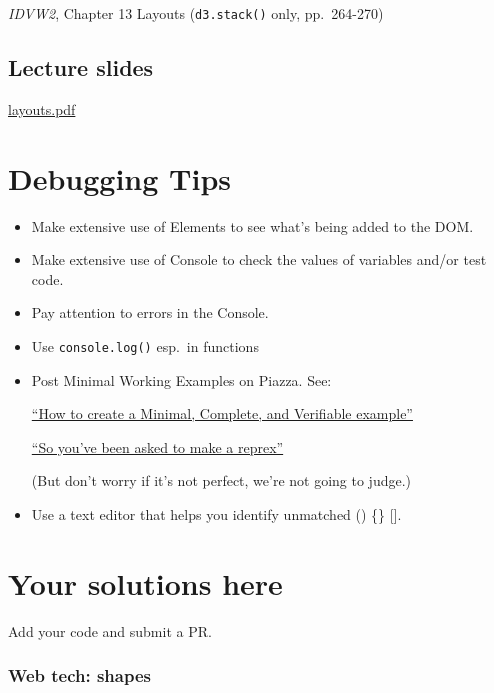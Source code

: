 \documentclass[openany]{book}
\begin{document}
\emph{IDVW2}, Chapter 13 Layouts (\texttt{d3.stack()} only, pp.~264-270)

\hypertarget{lecture-slides-7}{%
\section{Lecture slides }\label{lecture-slides-7}}

\href{pdfs/layouts.pdf}{layouts.pdf}

\hypertarget{debugging-tips}{%
\chapter{Debugging Tips }\label{debugging-tips}}

\begin{itemize}
\item
  Make extensive use of Elements to see what's being added to the DOM.
\item
  Make extensive use of Console to check the values of variables and/or test code.
\item
  Pay attention to errors in the Console.
\item
  Use \texttt{console.log()} esp.~in functions
\item
  Post Minimal Working Examples on Piazza. See:

  \href{https://stackoverflow.com/help/mcve}{``How to create a Minimal, Complete, and Verifiable example''}

  \href{https://www.jessemaegan.com/post/so-you-ve-been-asked-to-make-a-reprex/}{``So you've been asked to make a reprex''}

  (But don't worry if it's not perfect, we're not going to judge.)
\item
  Use a text editor that helps you identify unmatched () \{\} {[}{]}.
\end{itemize}

\hypertarget{your-solutions-here}{%
\chapter{Your solutions here }\label{your-solutions-here}}

Add your code and submit a PR.

\hypertarget{web-tech-shapes}{%
\subsection*{Web tech: shapes}\label{web-tech-shapes}}
\end{document}
